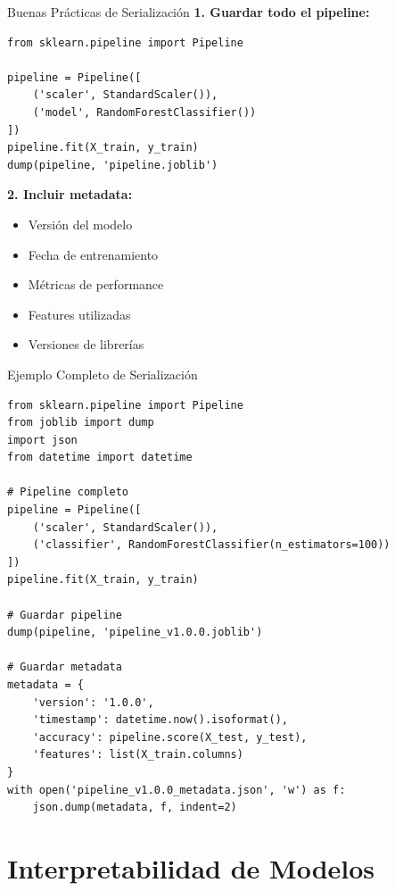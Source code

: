 \documentclass[aspectratio=169]{beamer}
\begin{document}
\begin{frame}[fragile]{Buenas Prácticas de Serialización}
\textbf{1. Guardar todo el pipeline:}
\begin{verbatim}
from sklearn.pipeline import Pipeline

pipeline = Pipeline([
    ('scaler', StandardScaler()),
    ('model', RandomForestClassifier())
])
pipeline.fit(X_train, y_train)
dump(pipeline, 'pipeline.joblib')
\end{verbatim}

\vspace{0.3cm}

\textbf{2. Incluir metadata:}
\begin{itemize}
\item Versión del modelo
\item Fecha de entrenamiento
\item Métricas de performance
\item Features utilizadas
\item Versiones de librerías
\end{itemize}
\end{frame}

\begin{frame}[fragile]{Ejemplo Completo de Serialización}
\small
\begin{verbatim}
from sklearn.pipeline import Pipeline
from joblib import dump
import json
from datetime import datetime

# Pipeline completo
pipeline = Pipeline([
    ('scaler', StandardScaler()),
    ('classifier', RandomForestClassifier(n_estimators=100))
])
pipeline.fit(X_train, y_train)

# Guardar pipeline
dump(pipeline, 'pipeline_v1.0.0.joblib')

# Guardar metadata
metadata = {
    'version': '1.0.0',
    'timestamp': datetime.now().isoformat(),
    'accuracy': pipeline.score(X_test, y_test),
    'features': list(X_train.columns)
}
with open('pipeline_v1.0.0_metadata.json', 'w') as f:
    json.dump(metadata, f, indent=2)
\end{verbatim}
\end{frame}

\section{Interpretabilidad de Modelos}
\end{document}
